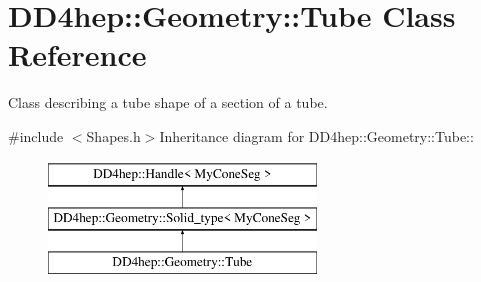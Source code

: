 \hypertarget{class_d_d4hep_1_1_geometry_1_1_tube}{
\section{DD4hep::Geometry::Tube Class Reference}
\label{class_d_d4hep_1_1_geometry_1_1_tube}
}


Class describing a tube shape of a section of a tube.  


{\ttfamily \#include $<$Shapes.h$>$}Inheritance diagram for DD4hep::Geometry::Tube::\begin{figure}[H]
\begin{center}
\leavevmode
\includegraphics[height=3cm]{class_d_d4hep_1_1_geometry_1_1_tube}
\end{center}
\end{figure}
